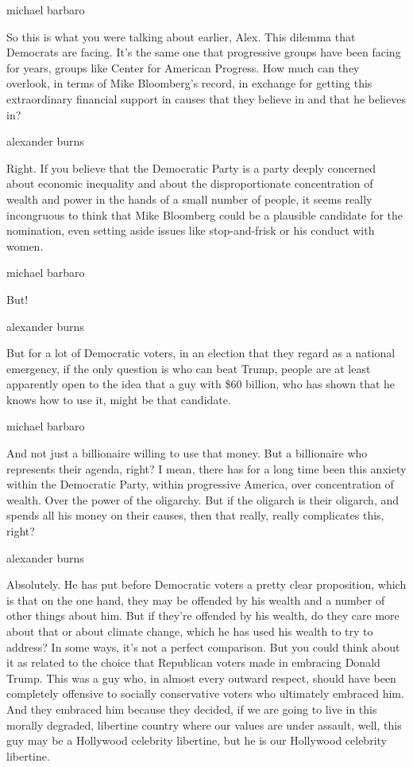 michael barbaro

So this is what you were talking about earlier, Alex. This dilemma that
Democrats are facing. It's the same one that progressive groups have
been facing for years, groups like Center for American Progress. How
much can they overlook, in terms of Mike Bloomberg's record, in exchange
for getting this extraordinary financial support in causes that they
believe in and that he believes in?

alexander burns

Right. If you believe that the Democratic Party is a party deeply
concerned about economic inequality and about the disproportionate
concentration of wealth and power in the hands of a small number of
people, it seems really incongruous to think that Mike Bloomberg could
be a plausible candidate for the nomination, even setting aside issues
like stop-and-frisk or his conduct with women.

michael barbaro

But!

alexander burns

But for a lot of Democratic voters, in an election that they regard as a
national emergency, if the only question is who can beat Trump, people
are at least apparently open to the idea that a guy with \$60 billion,
who has shown that he knows how to use it, might be that candidate.

michael barbaro

And not just a billionaire willing to use that money. But a billionaire
who represents their agenda, right? I mean, there has for a long time
been this anxiety within the Democratic Party, within progressive
America, over concentration of wealth. Over the power of the oligarchy.
But if the oligarch is their oligarch, and spends all his money on their
causes, then that really, really complicates this, right?

alexander burns

Absolutely. He has put before Democratic voters a pretty clear
proposition, which is that on the one hand, they may be offended by his
wealth and a number of other things about him. But if they're offended
by his wealth, do they care more about that or about climate change,
which he has used his wealth to try to address? In some ways, it's not a
perfect comparison. But you could think about it as related to the
choice that Republican voters made in embracing Donald Trump. This was a
guy who, in almost every outward respect, should have been completely
offensive to socially conservative voters who ultimately embraced him.
And they embraced him because they decided, if we are going to live in
this morally degraded, libertine country where our values are under
assault, well, this guy may be a Hollywood celebrity libertine, but he
is our Hollywood celebrity libertine.

